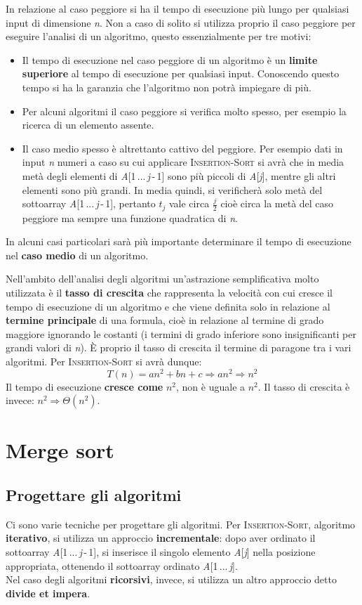 \documentclass[10pt, a4paper]{report}
\begin{document}
In relazione al caso peggiore si ha il tempo di esecuzione più lungo per qualsiasi input di dimensione \textit{n}. Non a caso di solito si utilizza proprio il caso peggiore per eseguire l'analisi di un algoritmo, questo essenzialmente per tre motivi:
\begin{itemize}
\item Il tempo di esecuzione nel caso peggiore di un algoritmo è un \textbf{limite superiore} al tempo di esecuzione per qualsiasi input. Conoscendo questo tempo si ha la garanzia che l'algoritmo non potrà impiegare di più.
\item Per alcuni algoritmi il caso peggiore si verifica molto spesso, per esempio la ricerca di un elemento assente.
\item Il caso medio spesso è altrettanto cattivo del peggiore. Per esempio dati in input \textit{n} numeri a caso su cui applicare \textsc{Insertion-Sort} si avrà che in media metà degli elementi di \textit{A}[1\,...\,\textit{j}\,-\,1] sono più piccoli di \textit{A}[\textit{j}], mentre gli altri elementi sono più grandi. In media quindi, si verificherà solo metà del sottoarray \textit{A}[1\,...\,\textit{j}\,-\,1], pertanto $t_j$ vale circa $\frac{j}{2}$ cioè circa la metà del caso peggiore ma sempre una funzione quadratica di \textit{n}.
\end{itemize}
In alcuni casi particolari sarà più importante determinare il tempo di esecuzione nel \textbf{caso medio} di un algoritmo.

Nell'ambito dell'analisi degli algoritmi un'astrazione semplificativa molto utilizzata è il \textbf{tasso di crescita} che rappresenta la velocità con cui cresce il tempo di esecuzione di un algoritmo e che viene definita solo in relazione al \textbf{termine principale} di una formula, cioè in relazione al termine di grado maggiore ignorando le costanti (i termini di grado inferiore sono insignificanti per grandi valori di \textit{n}). È proprio il tasso di crescita il termine di paragone tra i vari algoritmi. Per \textsc{Insertion-Sort} si avrà dunque:
\begin{equation*}
T(n) = an^2 + bn + c \Rightarrow an^2 \Rightarrow n^2
\end{equation*}
Il tempo di esecuzione \textbf{cresce come} $n^2$, non è uguale a $n^2$. Il tasso di crescita è invece: $n^2 \Rightarrow \Theta(n^2)$.
\chapter{Merge sort}
\section{Progettare gli algoritmi}
Ci sono varie tecniche per progettare gli algoritmi. Per \textsc{Insertion-Sort}, algoritmo \textbf{iterativo}, si utilizza un approccio \textbf{incrementale}: dopo aver ordinato il sottoarray \textit{A}[1\,...\,\textit{j}\,-\,1], si inserisce il singolo elemento \textit{A}[\textit{j}] nella posizione appropriata, ottenendo il sottoarray ordinato \textit{A}[1\,...\,\textit{j}].\\Nel caso degli algoritmi \textbf{ricorsivi}, invece, si utilizza un altro approccio detto \textbf{divide et impera}.
\end{document}
